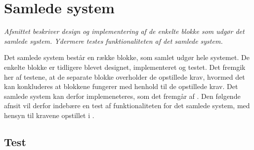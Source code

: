\section{Samlede system}
\textit{Afsnittet beskriver design og implementering af de enkelte blokke som udgør det samlede system. Ydermere testes funktionaliteten af det samlede system.}

Det samlede system består en række blokke, som samlet udgør hele systemet. De enkelte blokke er tidligere blevet designet, implementeret og testet. Det fremgik her af testene, at de separate blokke overholder de opstillede krav, hvormed det kan konkluderes at blokkene fungerer med henhold til de opstillede krav. Det samlede system kan derfor implemeneteres, som det fremgår af . Den følgende afnsit vil derfor indebære en test af funktionaliteten for det samlede system, med hensyn til kravene opstillet i . 

\subsection{Test}
